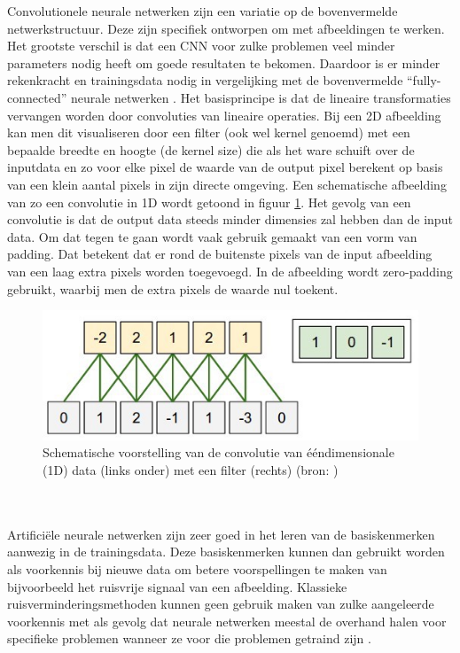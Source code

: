 \documentclass{report}
\begin{document}
Convolutionele neurale netwerken zijn een variatie op de bovenvermelde netwerkstructuur. Deze zijn specifiek ontworpen om met afbeeldingen te werken. Het grootste verschil is dat een CNN voor zulke problemen veel minder parameters nodig heeft om goede resultaten te bekomen. Daardoor is er minder rekenkracht en trainingsdata nodig in vergelijking met de bovenvermelde ``fully-connected'' neurale netwerken \cite{paper:lecun, paper:lecuncnn}. Het basisprincipe is dat de lineaire transformaties vervangen worden door convoluties van lineaire operaties. Bij een 2D afbeelding kan men dit visualiseren door een filter (ook wel kernel genoemd) met een bepaalde breedte en hoogte (de kernel size) die als het ware schuift over de inputdata en zo voor elke pixel de waarde van de output pixel berekent op basis van een klein aantal pixels in zijn directe omgeving. Een schematische afbeelding van zo een convolutie in 1D wordt getoond in figuur \ref{fig:tem_convolution}. Het gevolg van een convolutie is dat de output data steeds minder dimensies zal hebben dan de input data. Om dat tegen te gaan wordt vaak gebruik gemaakt van een vorm van padding. Dat betekent dat er rond de buitenste pixels van de input afbeelding van een laag extra pixels worden toegevoegd. In de afbeelding wordt zero-padding gebruikt, waarbij men de extra pixels de waarde nul toekent.
\begin{figure}[h!]
	\centering
	\includegraphics[width=12cm]{images/tem/convolution.jpg}
	\caption{Schematische voorstelling van de convolutie van ééndimensionale (1D) data (links onder) met een filter (rechts) (bron: \cite{online:cnn})}
	\label{fig:tem_convolution}
\end{figure}
\\ \\
Artificiële neurale netwerken zijn zeer goed in het leren van de basiskenmerken aanwezig in de trainingsdata. Deze basiskenmerken kunnen dan gebruikt worden als voorkennis bij nieuwe data om betere voorspellingen te maken van bijvoorbeeld het ruisvrije signaal van een afbeelding. Klassieke ruisverminderingsmethoden kunnen geen gebruik maken van zulke aangeleerde voorkennis met als gevolg dat neurale netwerken meestal de overhand halen voor specifieke problemen wanneer ze voor die problemen getraind zijn \cite{paper:denoising, paper:learneddenoising, paper:dictlearning, paper:superres}.
\end{document}

